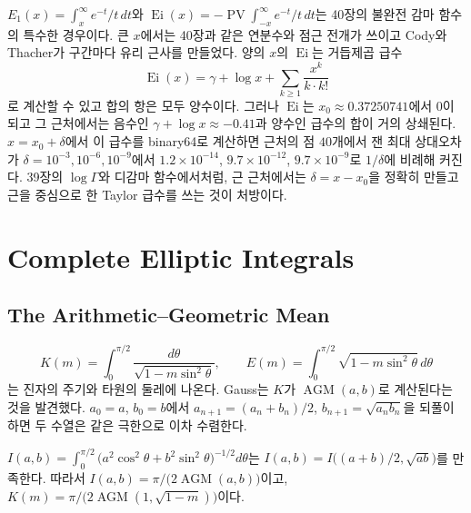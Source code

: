  $E_1(x)=\int_x^\infty e^{-t}/t\,dt$와 $\operatorname{Ei}(x)=-\operatorname{PV}\!\int_{-x}^\infty e^{-t}/t\,dt$는 40장의 불완전 감마 함수의 특수한 경우이다. 큰 $x$에서는 40장과 같은 연분수와 점근 전개가 쓰이고 Cody와 Thacher가 구간마다 유리 근사를 만들었다\cite{cody1968e1}. 양의 $x$의 $\operatorname{Ei}$는 거듭제곱 급수
\[
\operatorname{Ei}(x)=\gamma+\log x+\sum_{k\ge1}\frac{x^k}{k\cdot k!}
\]
로 계산할 수 있고 합의 항은 모두 양수이다. 그러나 $\operatorname{Ei}$는 $x_0\approx0.37250741$에서 $0$이 되고 그 근처에서는 음수인 $\gamma+\log x\approx-0.41$과 양수인 급수의 합이 거의 상쇄된다. $x=x_0+\delta$에서 이 급수를 binary64로 계산하면 근처의 점 $40$개에서 잰 최대 상대오차가 $\delta=10^{-3},10^{-6},10^{-9}$에서 $1.2\times10^{-14}$, $9.7\times10^{-12}$, $9.7\times10^{-9}$로 $1/\delta$에 비례해 커진다. 39장의 $\log\Gamma$와 디감마 함수에서처럼, 근 근처에서는 $\delta=x-x_0$을 정확히 만들고 근을 중심으로 한 Taylor 급수를 쓰는 것이 처방이다.

\section{Complete Elliptic Integrals}
\label{sec:elliptic}

\subsection{The Arithmetic--Geometric Mean}

\[
K(m)=\int_0^{\pi/2}\frac{d\theta}{\sqrt{1-m\sin^2\theta}},\qquad E(m)=\int_0^{\pi/2}\sqrt{1-m\sin^2\theta}\,d\theta
\]
는 진자의 주기와 타원의 둘레에 나온다. Gauss는 $K$가  $\operatorname{AGM}(a,b)$로 계산된다는 것을 발견했다. $a_0=a$, $b_0=b$에서 $a_{n+1}=(a_n+b_n)/2$, $b_{n+1}=\sqrt{a_nb_n}$을 되풀이하면 두 수열은 같은 극한으로 이차 수렴한다.

\begin{proposition}
\label{prop:agm-k}
$I(a,b)=\int_0^{\pi/2}\bigl(a^2\cos^2\theta+b^2\sin^2\theta\bigr)^{-1/2}d\theta$는 $I(a,b)=I\bigl((a+b)/2,\sqrt{ab}\bigr)$를 만족한다. 따라서 $I(a,b)=\pi/\bigl(2\operatorname{AGM}(a,b)\bigr)$이고, $K(m)=\pi/\bigl(2\operatorname{AGM}(1,\sqrt{1-m})\bigr)$이다.
\end{proposition}

